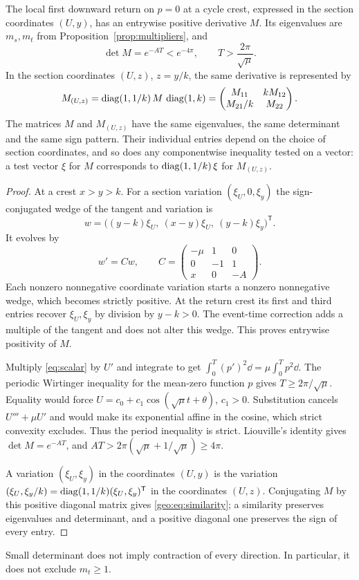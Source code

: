 \begin{proposition}\label{prop:crestmap}
The local first downward return on $p=0$ at a cycle crest, expressed in the section coordinates $(U,y)$, has an entrywise positive derivative $M$. Its eigenvalues are $m_s,m_t$ from Proposition~\ref{prop:multipliers}, and
\begin{equation}\label{eq:determinant}
\det M=e^{-AT}<e^{-4\pi},\qquad T>\frac{2\pi}{\sqrt\mu}.
\end{equation}
In the section coordinates $(U,z)$, $z=y/k$, the same derivative is represented by
\begin{equation}\label{geo:eq:similarity}
M_{(U,z)}=\operatorname{diag}(1,1/k)\,M\,\operatorname{diag}(1,k)
=\begin{pmatrix}M_{11}&kM_{12}\\ M_{21}/k&M_{22}\end{pmatrix}.
\end{equation}
The matrices $M$ and $M_{(U,z)}$ have the same eigenvalues, the same determinant and the same sign pattern. Their individual entries depend on the choice of section coordinates, and so does any componentwise inequality tested on a vector: a test vector $\xi$ for $M$ corresponds to $\operatorname{diag}(1,1/k)\,\xi$ for $M_{(U,z)}$.
\end{proposition}
\begin{proof}
At a crest $x>y>k$. For a section variation $(\xi_U,0,\xi_y)$ the sign-conjugated wedge of the tangent and variation is
\[
w=\bigl((y-k)\xi_U,\ (x-y)\xi_U,\ (y-k)\xi_y\bigr)^{\mathsf T}.
\]
It evolves by
\begin{equation}\label{eq:compound}
w'=Cw,\qquad C=\begin{pmatrix}-\mu&1&0\\0&-1&1\\x&0&-A\end{pmatrix}.
\end{equation}
Each nonzero nonnegative coordinate variation starts a nonzero nonnegative wedge, which becomes strictly positive. At the return crest its first and third entries recover $\xi_U,\xi_y$ by division by $y-k>0$. The event-time correction adds a multiple of the tangent and does not alter this wedge. This proves entrywise positivity of $M$.

Multiply \eqref{eq:scalar} by $U'$ and integrate to get $\int_0^T(p')^2\dd=\mu\int_0^T p^2\dd$. The periodic Wirtinger inequality for the mean-zero function $p$ gives $T\ge2\pi/\sqrt\mu$. Equality would force $U=c_0+c_1\cos(\sqrt\mu t+\theta)$, $c_1>0$. Substitution cancels $U'''+\mu U'$ and would make its exponential affine in the cosine, which strict convexity excludes. Thus the period inequality is strict. Liouville's identity gives $\det M=e^{-AT}$, and $AT>2\pi(\sqrt\mu+1/\sqrt\mu)\ge4\pi$.

A variation $(\xi_U,\xi_y)$ in the coordinates $(U,y)$ is the variation $(\xi_U,\xi_y/k)=\operatorname{diag}(1,1/k)(\xi_U,\xi_y)^{\mathsf T}$ in the coordinates $(U,z)$. Conjugating $M$ by this positive diagonal matrix gives \eqref{geo:eq:similarity}; a similarity preserves eigenvalues and determinant, and a positive diagonal one preserves the sign of every entry.
\end{proof}
Small determinant does not imply contraction of every direction. In particular, it does not exclude $m_t\ge1$.
